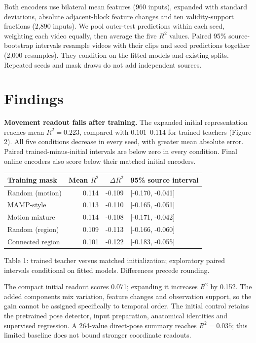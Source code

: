 \documentclass{article}
\begin{document}
Both encoders use bilateral mean features (960 inputs), expanded with
standard deviations, absolute adjacent-block feature changes and ten
validity-support fractions (2,890 inputs). We pool outer-test
predictions within each seed, weighting each video equally, then average
the five \(R^2\) values. Paired 95\% source-bootstrap intervals resample
videos with their clips and seed predictions together (2,000 resamples).
They condition on the fitted models and existing splits. Repeated seeds
and mask draws do not add independent sources.

\section{Findings}\label{findings}

\textbf{Movement readout falls after training.} The expanded initial
representation reaches mean \(R^2=0.223\), compared with
\(0.101\)--\(0.114\) for trained teachers (Figure 2). All five
conditions decrease in every seed, with greater mean absolute error.
Paired trained-minus-initial intervals are below zero in every
condition. Final online encoders also score below their matched initial
encoders.

\begin{center}
\begin{tabular}{lrrl}
\toprule
Training mask & Mean $R^2$ & $\Delta R^2$ & 95\% source interval \\
\midrule
Random (motion) & 0.114 & -0.109 & [-0.170, -0.041] \\
MAMP-style & 0.113 & -0.110 & [-0.165, -0.051] \\
Motion mixture & 0.114 & -0.108 & [-0.171, -0.042] \\
Random (region) & 0.109 & -0.113 & [-0.166, -0.060] \\
Connected region & 0.101 & -0.122 & [-0.183, -0.055] \\
\bottomrule
\end{tabular}
\end{center}

Table 1: trained teacher versus matched initialization; exploratory
paired intervals conditional on fitted models. Differences precede
rounding.

The compact initial readout scores 0.071; expanding it increases \(R^2\)
by 0.152. The added components mix variation, feature changes and
observation support, so the gain cannot be assigned specifically to
temporal order. The initial control retains the pretrained pose
detector, input preparation, anatomical identities and supervised
regression. A 264-value direct-pose summary reaches \(R^2=0.035\); this
limited baseline does not bound stronger coordinate readouts.
\end{document}
